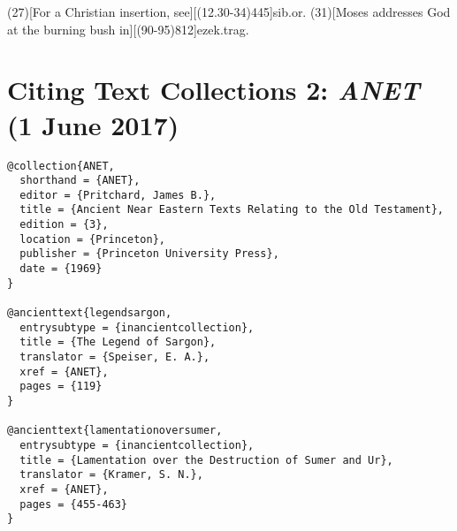 \documentclass[a4paper]{article}
\renewcommand\footnote[1]{##1}%
\begin{document}
\examplecite(27)[For a Christian insertion, see][(12.30-34)445]{sib.or.}
\examplecite(31)[Moses addresses God at the burning bush in][(90-95)812]{ezek.trag.}
\exampleancientsources
\examplesecondarysources
{}

\section{Citing Text Collections 2: \emph{ANET} (1 June 2017)}

\begin{verbatim}
@collection{ANET,
  shorthand = {ANET},
  editor = {Pritchard, James B.},
  title = {Ancient Near Eastern Texts Relating to the Old Testament},
  edition = {3},
  location = {Princeton},
  publisher = {Princeton University Press},
  date = {1969}
}

@ancienttext{legendsargon,
  entrysubtype = {inancientcollection},
  title = {The Legend of Sargon},
  translator = {Speiser, E. A.},
  xref = {ANET},
  pages = {119}
}

@ancienttext{lamentationoversumer,
  entrysubtype = {inancientcollection},
  title = {Lamentation over the Destruction of Sumer and Ur},
  translator = {Kramer, S. N.},
  xref = {ANET},
  pages = {455-463}
}
\end{verbatim}
\end{document}
